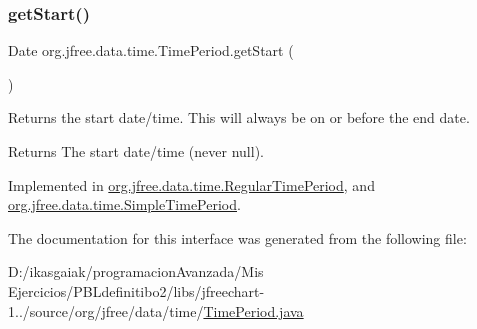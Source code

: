 \subsubsection{\texorpdfstring{get\+Start()}{getStart()}}
{\footnotesize\ttfamily Date org.\+jfree.\+data.\+time.\+Time\+Period.\+get\+Start (\begin{DoxyParamCaption}{ }\end{DoxyParamCaption})}

Returns the start date/time. This will always be on or before the end date.

\begin{DoxyReturn}{Returns}
The start date/time (never {\ttfamily null}). 
\end{DoxyReturn}


Implemented in \mbox{\hyperlink{classorg_1_1jfree_1_1data_1_1time_1_1_regular_time_period_aaa6e30c0526db40f5a63b5a9e4cf7d34}{org.\+jfree.\+data.\+time.\+Regular\+Time\+Period}}, and \mbox{\hyperlink{classorg_1_1jfree_1_1data_1_1time_1_1_simple_time_period_aad32b7d42e1b0da520b2101321601142}{org.\+jfree.\+data.\+time.\+Simple\+Time\+Period}}.



The documentation for this interface was generated from the following file\+:\begin{DoxyCompactItemize}
\item 
D\+:/ikasgaiak/programacion\+Avanzada/\+Mis Ejercicios/\+P\+B\+Ldefinitibo2/libs/jfreechart-\/1../source/org/jfree/data/time/\mbox{\hyperlink{_time_period_8java}{Time\+Period.\+java}}\end{DoxyCompactItemize}
